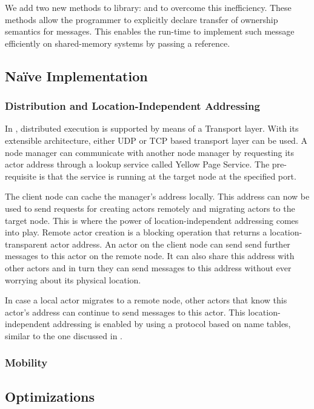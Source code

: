 We add two new methods to \af{} library:  and  to overcome this inefficiency. These methods allow the programmer to explicitly declare transfer of ownership semantics for messages. This enables the run-time to implement such message efficiently on shared-memory systems by passing a reference.

\subsection{Na\"ive Implementation}
\subsubsection{Distribution and Location-Independent Addressing}
In \oaf{}, distributed execution is supported by means of a Transport layer. With its extensible architecture, either UDP or TCP based transport layer can be used. A node manager can communicate with another node manager by requesting its actor address through a lookup service called Yellow Page Service. The pre-requisite is that the service is running at the target node at the specified port. 

The client node can cache the manager's address locally. This address can now be used to send requests for creating actors remotely and migrating actors to the target node. This is where the power of location-independent addressing comes into play. Remote actor creation is a blocking operation that returns a location-transparent actor address. An actor on the client node can send send further messages to this actor on the remote node. It can also share this address with other actors and in turn they can send messages to this address without ever worrying about its physical location. 

In case a local actor migrates to a remote node, other actors that know this actor's address can continue to send messages to this actor. This location-independent addressing is enabled by using a protocol based on name tables, similar to the one discussed in \cite{sc95}.

\subsubsection{Mobility}

\subsection{Optimizations}


